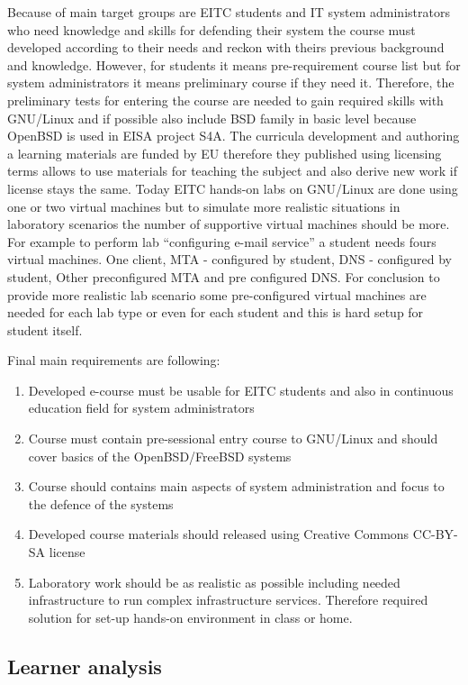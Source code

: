 Because of main target groups are \gls{EITC} students and IT system administrators who need knowledge and skills for defending their system the course must developed according to their needs and reckon with theirs previous background and knowledge. However, for students it means pre-requirement course list but for system administrators it means preliminary course if they need it. Therefore, the preliminary tests for entering the course are needed to gain required skills with GNU/Linux and if possible also include BSD family in basic level because OpenBSD is used in \gls{EISA} project S4A.
The curricula development and authoring a learning materials are funded by EU therefore they  published using licensing terms allows to use materials for teaching the subject and also derive new work if license stays the same.
Today EITC hands-on labs on GNU/Linux are done using one or two virtual machines but to simulate more realistic situations in laboratory scenarios the number of supportive virtual machines should be more. For example to perform lab “configuring e-mail service” a student needs fours virtual machines. One client, MTA - configured by student, DNS -  configured by student, Other preconfigured MTA and pre configured DNS. For conclusion to provide more realistic lab scenario some pre-configured virtual machines are needed for each lab type or even for each student and this is hard setup for student itself.

Final main requirements are following:
\begin{enumerate}[label=Requirement \arabic*.,leftmargin=*]
  \item Developed e-course must be usable for \gls{EITC} students and also in continuous education field for system administrators
  \item Course must contain pre-sessional entry course to GNU/Linux and should cover basics  of the OpenBSD/FreeBSD systems
  \item Course should contains main aspects of system administration and focus to the defence of the systems
  \item Developed course materials should released using Creative Commons \gls{CC-BY-SA} license
  \item Laboratory work should be as realistic as possible including needed infrastructure to run complex infrastructure services. Therefore required solution for set-up hands-on environment in class or home.
\end{enumerate}


\subsection{Learner analysis}


